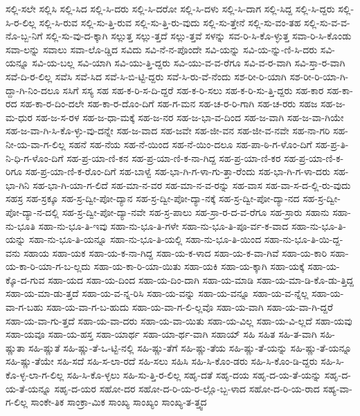 {ಸಲ್ಲಿ-ಸಲೇ
ಸಲ್ಲಿಸಿ
ಸಲ್ಲಿ-ಸಿದ
ಸಲ್ಲಿ-ಸಿ-ದರು
ಸಲ್ಲಿ-ಸಿ-ದರೋ
ಸಲ್ಲಿ-ಸಿ-ದಳು
ಸಲ್ಲಿ-ಸಿ-ದಾಗ
ಸಲ್ಲಿ-ಸಿದ್ದ
ಸಲ್ಲಿ-ಸಿ-ದ್ದರು
ಸಲ್ಲಿ-ಸಿ-ರ-ಲಿಲ್ಲ
ಸಲ್ಲಿ-ಸಿ-ರುವ
ಸಲ್ಲಿ-ಸು-ತ್ತಿ-ರುವ
ಸಲ್ಲಿ-ಸು-ತ್ತಿ-ರು-ವುದು
ಸಲ್ಲಿ-ಸು-ತ್ತೇನೆ
ಸಲ್ಲಿ-ಸು-ವಂ-ತಹ
ಸಲ್ಲಿ-ಸು-ವ-ವ-ನೊ-ಬ್ಬ-ನಿಗೆ
ಸಲ್ಲಿ-ಸು-ವು-ದ-ಕ್ಕಾಗಿ
ಸಲ್ಲುತ್ತ
ಸಲ್ಲು-ತ್ತದೆ
ಸಲ್ಲು-ತ್ತವೆ
ಸಳನ್ನು
ಸವ-ರಿ-ಸಿ-ಕೊ-ಳ್ಳುತ್ತ
ಸವಾ-ರಿ-ಸಿ-ಕೊಂಡು
ಸವಾ-ಲನ್ನು
ಸವಾಲು
ಸವಾ-ಲೊ-ಡ್ಡಿದ
ಸವಿದು
ಸವಿ-ನೆ-ನ-ಪೊಂದೇ
ಸವಿ-ಯನ್ನು
ಸವಿ-ಯ-ನ್ನು-ಣಿ-ಸಿ-ದರು
ಸವಿ-ಯನ್ನೂ
ಸವಿ-ಯ-ಬಲ್ಲ
ಸವಿ-ಯಾಗಿ
ಸವಿ-ಯು-ತ್ತಿ-ದ್ದರು
ಸವಿ-ಯು-ವ-ವ-ರೆಗೂ
ಸವಿ-ವ-ರ-ವಾಗಿ
ಸವಿ-ಸ್ತಾ-ರ-ವಾಗಿ
ಸವೆ-ದಿ-ರ-ಲಿಲ್ಲ
ಸವೆಸಿ
ಸವೆ-ಸಿದ
ಸವೆ-ಸಿ-ಬಿ-ಟ್ಟಿ-ದ್ದರು
ಸವೆ-ಸಿ-ರು-ವೆ-ನೆಂದು
ಸಶ-ರೀ-ರಿ-ಯಾಗಿ
ಸಶ-ರೀ-ರಿ-ಯಾ-ಗಿ-ದ್ದಾ-ಗಿ-ನಿಂ-ದಲೂ
ಸಸಿಗೆ
ಸಸ್ಯ
ಸಹ
ಸಹ-ಕ-ರಿ-ಸ-ದಿ-ದ್ದರೆ
ಸಹ-ಕ-ರಿ-ಸಲು
ಸಹ-ಕ-ರಿ-ಸು-ತ್ತಿ-ದ್ದರು
ಸಹ-ಕಾರ
ಸಹ-ಕಾ-ರದ
ಸಹ-ಕಾ-ರ-ದಿಂ-ದಲೇ
ಸಹ-ಕಾ-ರ-ದೊಂ-ದಿಗೆ
ಸಹ-ಗ-ಮನ
ಸಹ-ಚ-ರ-ರಿ-ಗಾಗಿ
ಸಹ-ಚ-ರರು
ಸಹಜ
ಸಹ-ಜ-ಮ-ಧುರ
ಸಹ-ಜ-ಸ-ರಳ
ಸಹ-ಜ-ಧಾ-ಮಕ್ಕೆ
ಸಹ-ಜ-ನರ
ಸಹ-ಜ-ಭಾ-ವ-ದಿಂದ
ಸಹ-ಜ-ವಾಗಿ
ಸಹ-ಜ-ವಾ-ಗಿಯೇ
ಸಹ-ಜ-ವಾ-ಗಿ-ಸಿ-ಕೊ-ಳ್ಳು-ವು-ದನ್ನೇ
ಸಹ-ಜ-ವಾದ
ಸಹ-ಜವೇ
ಸಹ-ಜೀ-ವನ
ಸಹ-ಜೀ-ವ-ನವೇ
ಸಹ-ನಾ-ಗರಿ
ಸಹ-ನೀ-ಯ-ವಾ-ಗ-ಲಿಲ್ಲ
ಸಹನೆ
ಸಹ-ನೆಯ
ಸಹ-ನೆ-ಯಿಂದ
ಸಹ-ನೆ-ಯಿಂ-ದಲೂ
ಸಹ-ಪಾ-ಠಿ-ಗ-ಳೊಂ-ದಿಗೆ
ಸಹ-ಪ್ರ-ತಿ-ನಿ-ಧಿ-ಗ-ಳೊಂ-ದಿಗೆ
ಸಹ-ಪ್ರ-ಯಾ-ಣಿ-ಕನ
ಸಹ-ಪ್ರ-ಯಾ-ಣಿ-ಕ-ನಾ-ಗಿದ್ದ
ಸಹ-ಪ್ರ-ಯಾ-ಣಿ-ಕರ
ಸಹ-ಪ್ರ-ಯಾ-ಣಿ-ಕ-ರಿಗೂ
ಸಹ-ಪ್ರ-ಯಾ-ಣಿ-ಕ-ರೊಂ-ದಿಗೆ
ಸಹ-ಬಾಳ್ವೆ
ಸಹ-ಭಾ-ಗಿ-ಗ-ಳಾ-ಗು-ತ್ತಾ-ರೆಂದು
ಸಹ-ಭಾ-ಗಿ-ಗ-ಳಾ-ದರು
ಸಹ-ಭಾ-ಗಿನಿ
ಸಹ-ಭಾ-ಗಿ-ಯಾ-ಗ-ಲಿದೆ
ಸಹ-ಮಾ-ನ-ವರ
ಸಹ-ಮಾ-ನ-ವ-ರನ್ನು
ಸಹ-ವಾಸ
ಸಹ-ವಾ-ಸ-ದ-ಲ್ಲಿ-ರು-ವುದು
ಸಹಸ್ರ
ಸಹ-ಸ್ರಕ್ಕೂ
ಸಹ-ಸ್ರ-ದ್ವೀ-ಪೋ-ದ್ಯಾನ
ಸಹ-ಸ್ರ-ದ್ವೀ-ಪೋ-ದ್ಯಾ-ನಕ್ಕೆ
ಸಹ-ಸ್ರ-ದ್ವೀ-ಪೋ-ದ್ಯಾ-ನದ
ಸಹ-ಸ್ರ-ದ್ವೀ-ಪೋ-ದ್ಯಾ-ನ-ದಲ್ಲಿ
ಸಹ-ಸ್ರ-ದ್ವೀ-ಪೋ-ದ್ಯಾ-ನವೇ
ಸಹ-ಸ್ರ-ಪಾಲು
ಸಹ-ಸ್ರಾ-ರ-ದ-ವ-ರೆಗೂ
ಸಹ-ಸ್ರಾರು
ಸಹಾನು
ಸಹಾ-ನು-ಭೂತಿ
ಸಹಾ-ನು-ಭೂ-ತಿ-ಇವು
ಸಹಾ-ನು-ಭೂ-ತಿ-ಗಳೇ
ಸಹಾ-ನು-ಭೂ-ತಿ-ಪೂ-ರ್ವ-ಕ-ವಾದ
ಸಹಾ-ನು-ಭೂ-ತಿ-ಯನ್ನು
ಸಹಾ-ನು-ಭೂ-ತಿ-ಯನ್ನೂ
ಸಹಾ-ನು-ಭೂ-ತಿ-ಯಲ್ಲಿ
ಸಹಾ-ನು-ಭೂ-ತಿ-ಯಿಂದ
ಸಹಾ-ನು-ಭೂ-ತಿ-ಯಿ-ದ್ದ-ವನು
ಸಹಾಯ
ಸಹಾ-ಯಕ
ಸಹಾ-ಯ-ಕ-ನಾ-ಗಿದ್ದ
ಸಹಾ-ಯ-ಕ-ಳಾದ
ಸಹಾ-ಯ-ಕ-ವಾ-ಗಿವೆ
ಸಹಾ-ಯ-ಕಾರಿ
ಸಹಾ-ಯ-ಕಾ-ರಿ-ಯಾ-ಗ-ಬ-ಲ್ಲದು
ಸಹಾ-ಯ-ಕಾ-ರಿ-ಯಾ-ಯಿತು
ಸಹಾ-ಯಕಿ
ಸಹಾ-ಯ-ಕ್ಕಾಗಿ
ಸಹಾ-ಯಕ್ಕೆ
ಸಹಾ-ಯ-ಕ್ಕೊ-ದ-ಗುವ
ಸಹಾ-ಯದ
ಸಹಾ-ಯ-ದಿಂದ
ಸಹಾ-ಯ-ದಿಂ-ದಾಗಿ
ಸಹಾ-ಯ-ಮಾಡಿ
ಸಹಾ-ಯ-ಮಾ-ಡಿ-ಕೊ-ಡು-ತ್ತಿದ್ದ
ಸಹಾ-ಯ-ಮಾ-ಡು-ತ್ತದೆ
ಸಹಾ-ಯ-ವ-ನ್ನ-ರಿಸಿ
ಸಹಾ-ಯ-ವನ್ನು
ಸಹಾ-ಯ-ವನ್ನೂ
ಸಹಾ-ಯ-ವ-ನ್ನೆಲ್ಲ
ಸಹಾ-ಯ-ವಾ-ಗ-ಬಹು
ಸಹಾ-ಯ-ವಾ-ಗ-ಬ-ಹುದು
ಸಹಾ-ಯ-ವಾ-ಗ-ಲಿ-ಲ್ಲವೊ
ಸಹಾ-ಯ-ವಾಗಿ
ಸಹಾ-ಯ-ವಾ-ಗಿ-ದ್ದರೆ
ಸಹಾ-ಯ-ವಾ-ಗು-ತ್ತದೆ
ಸಹಾ-ಯ-ವಾ-ದರು
ಸಹಾ-ಯ-ವಾ-ಯಿತು
ಸಹಾ-ಯ-ವಿಲ್ಲ
ಸಹಾ-ಯ-ವಿ-ಲ್ಲದೆ
ಸಹಾ-ಯವು
ಸಹಾ-ಯವೂ
ಸಹಾ-ಯ-ಹಸ್ತ
ಸಹಾ-ಯಾರ್ಥ
ಸಹಾ-ಯಾ-ರ್ಥ-ವಾಗಿ
ಸಹಾಯ್
ಸಹಿ
ಸಹಿತ
ಸಹಿ-ತ-ವಾಗಿ
ಸಹಿ-ಷ್ಣುತಾ
ಸಹಿ-ಷ್ಣುತೆ
ಸಹಿ-ಷ್ಣು-ತೆ-ಒ-ಟ್ಟಿ-ನಲ್ಲಿ
ಸಹಿ-ಷ್ಣು-ತೆಗೆ
ಸಹಿ-ಷ್ಣು-ತೆಯ
ಸಹಿ-ಷ್ಣು-ತೆ-ಯನ್ನು
ಸಹಿ-ಷ್ಣು-ತೆ-ಯನ್ನೂ
ಸಹಿ-ಷ್ಣು-ತೆಯೇ
ಸಹಿ-ಸದೆ
ಸಹಿ-ಸ-ಲಾ-ರದೆ
ಸಹಿ-ಸಲು
ಸಹಿಸಿ
ಸಹಿ-ಸಿ-ಕೊಂ-ಡರು
ಸಹಿ-ಸಿ-ಕೊಂ-ಡಿ-ದ್ದರು
ಸಹಿ-ಸಿ-ಕೊ-ಳ್ಳ-ಲಾ-ಗ-ಲಿಲ್ಲ
ಸಹಿ-ಸಿ-ಕೊ-ಳ್ಳಲು
ಸಹಿ-ಸು-ತ್ತಿ-ರ-ಲಿಲ್ಲ
ಸಹೃ-ದತೆ
ಸಹೃ-ದಯ
ಸಹೃ-ದ-ಯ-ತೆ-ಯನ್ನು
ಸಹೃ-ದ-ಯ-ತೆ-ಯನ್ನೂ
ಸಹೃ-ದ-ಯರ
ಸಹೋ-ದರ
ಸಹೋ-ದ-ರಿ-ಯ-ರ-ಲ್ಲೊ-ಬ್ಬ-ಳಾದ
ಸಹೋ-ದ-ರಿ-ಯ-ರಾದ
ಸಹ್ಯ-ವಾ-ಗ-ಲಿಲ್ಲ
ಸಾಂಕೇ-ತಿಕ
ಸಾಂಕ್ರಾ-ಮಿಕ
ಸಾಂಖ್ಯ
ಸಾಂಖ್ಯಂ
ಸಾಂಖ್ಯ-ತ-ತ್ತ್ವದ
}
